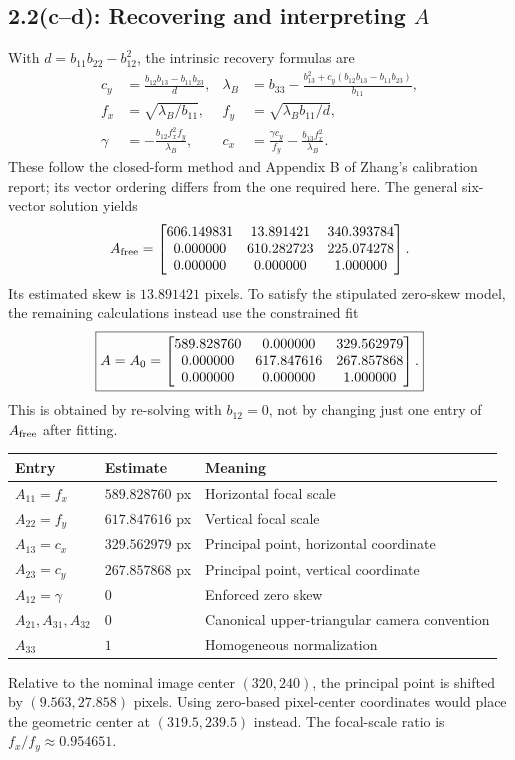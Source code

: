 \documentclass[10pt,letterpaper]{article}
\begin{document}
\clearpage
\subsection*{2.2(c--d): Recovering and interpreting $A$}
With $d=b_{11}b_{22}-b_{12}^2$, the intrinsic recovery formulas are
\begin{align*}
c_y&=\frac{b_{12}b_{13}-b_{11}b_{23}}{d},&
\lambda_B&=b_{33}-\frac{b_{13}^2+c_y(b_{12}b_{13}-b_{11}b_{23})}{b_{11}},\\
f_x&=\sqrt{\lambda_B/b_{11}},&f_y&=\sqrt{\lambda_B b_{11}/d},\\
\gamma&=-\frac{b_{12}f_x^2f_y}{\lambda_B},&
c_x&=\frac{\gamma c_y}{f_y}-\frac{b_{13}f_x^2}{\lambda_B}.
\end{align*}
These follow the closed-form method and Appendix B of Zhang's
calibration report; its vector ordering differs from the one required here.
The general six-vector solution yields
\[
A_{\rm free}=\begin{bmatrix}606.149831 & 13.891421 & 340.393784 \\ 0.000000 & 610.282723 & 225.074278 \\ 0.000000 & 0.000000 & 1.000000\end{bmatrix}.
\]
Its estimated skew is $13.891421$ pixels. To satisfy the stipulated
zero-skew model, the remaining calculations instead use the constrained fit
\begin{equation}
\boxed{A=A_0=\begin{bmatrix}589.828760 & 0.000000 & 329.562979 \\ 0.000000 & 617.847616 & 267.857868 \\ 0.000000 & 0.000000 & 1.000000\end{bmatrix}.}
\end{equation}
This is obtained by re-solving with $b_{12}=0$, not by changing just one
entry of $A_{\rm free}$ after fitting.

\begin{center}
\begin{tabular}{lll}
\toprule
Entry & Estimate & Meaning\\
\midrule
$A_{11}=f_x$ & $589.828760$ px & Horizontal focal scale\\
$A_{22}=f_y$ & $617.847616$ px & Vertical focal scale\\
$A_{13}=c_x$ & $329.562979$ px & Principal point, horizontal coordinate\\
$A_{23}=c_y$ & $267.857868$ px & Principal point, vertical coordinate\\
$A_{12}=\gamma$ & $0$ & Enforced zero skew\\
$A_{21},A_{31},A_{32}$ & $0$ & Canonical upper-triangular camera convention\\
$A_{33}$ & $1$ & Homogeneous normalization\\
\bottomrule
\end{tabular}
\end{center}
Relative to the nominal image center $(320,240)$, the principal point is
shifted by $(9.563,27.858)$ pixels. Using zero-based pixel-center coordinates
would place the geometric center at $(319.5,239.5)$ instead. The focal-scale
ratio is $f_x/f_y\approx0.954651$.
\end{document}
